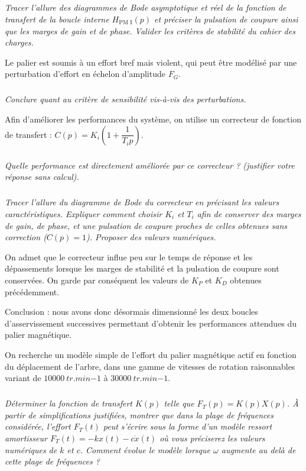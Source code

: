 \documentclass[10pt,fleqn]{article} %
\begin{document}
\begin{multicols}{2}
\subparagraph{}\textit{Tracer l'allure des diagrammes de Bode asymptotique et réel de la fonction
de transfert de la boucle interne $H_{\text{PM I}}(p)$ et préciser la pulsation de coupure ainsi que les marges de gain et de phase. Valider les critères de stabilité du cahier des charges.}

Le palier est soumis à un effort bref mais violent, qui peut être modélisé par une perturbation d'effort en
échelon d'amplitude $F_G$.

\subparagraph{}\textit{Conclure quant au critère de sensibilité vis-à-vis des perturbations.}

Afin d'améliorer les performances du système, on utilise un correcteur de fonction
de transfert : $C(p)=K_i\left(1+\dfrac{1}{T_i p} \right)$.

\subparagraph{}\textit{Quelle performance est directement améliorée par ce correcteur ? (justifier
votre réponse sans calcul).}


\subparagraph{}\textit{Tracer l'allure du diagramme de Bode du correcteur en précisant les
valeurs caractéristiques. Expliquer comment choisir $K_i$ et $T_i$ afin de conserver
des marges de gain, de phase, et une pulsation de coupure proches de celles obtenues
sans correction ($C(p)=1$). Proposer des valeurs numériques.}


On admet que le correcteur influe peu sur le temps de réponse et les dépassements
lorsque les marges de stabilité et la pulsation de coupure sont conservées.
On garde par conséquent les valeurs de $K_P$ et $K_D$ obtenues précédemment.

Conclusion : nous avons donc désormais dimensionné les deux boucles d'asservissement
successives permettant d'obtenir les performances attendues du palier
magnétique.

On recherche un modèle simple de l'effort du palier magnétique actif en fonction du
déplacement de l'arbre, dans une gamme de vitesses de rotation raisonnables
variant de $\SI{10000}{tr.min{-1}}$ à $\SI{30000}{tr.min{-1}}$.

\subparagraph{}\textit{Déterminer la fonction de transfert $K(p)$ telle que $F_T(p)=K(p)X(p)$.
À partir de simplifications justifiées, montrer que dans la plage de fréquences
considérée, l'effort $F_T(t)$ peut s'écrire sous la forme d'un modèle ressort amortisseur
$F_T(t)=-kx(t)-c\dot{x}(t)$ où vous préciserez les valeurs numériques de $k$ et $c$. Comment évolue le modèle lorsque
$\omega$ augmente au delà de cette plage de fréquences ?}



\end{multicols}
\end{document}
